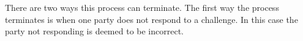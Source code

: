 % 
% 
% 
% 

There are two ways this process can terminate. The first way the process terminates is when one party does not respond to a challenge. In this case the party not responding is deemed to be incorrect.

